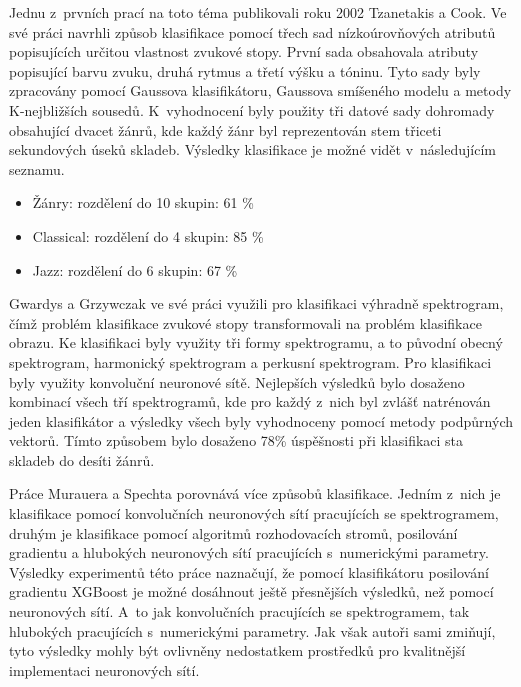 Jednu z~prvních prací na toto téma publikovali roku 2002 Tzanetakis a Cook. Ve své práci navrhli způsob klasifikace pomocí třech sad nízkoúrovňových atributů popisujících určitou vlastnost zvukové stopy. První sada obsahovala atributy popisující barvu zvuku, druhá rytmus a třetí výšku a tóninu. Tyto sady byly zpracovány pomocí Gaussova klasifikátoru, Gaussova smíšeného modelu a metody K-nejbližších sousedů. K~vyhodnocení byly použity tři datové sady dohromady obsahující dvacet žánrů, kde každý žánr byl reprezentován stem třiceti sekundových úseků skladeb. Výsledky klasifikace je možné vidět v~následujícím seznamu.\cite{1021072}

\begin{itemize}
\item Žánry: rozdělení do 10 skupin: 61 \%
\item Classical: rozdělení do 4 skupin: 85 \%
\item Jazz: rozdělení do 6 skupin: 67 \%
\end{itemize}

Gwardys a Grzywczak ve své práci využili pro klasifikaci výhradně spektrogram, čímž problém klasifikace zvukové stopy transformovali na problém klasifikace obrazu. Ke klasifikaci byly využity tři formy spektrogramu, a to původní obecný spektrogram, harmonický spektrogram a perkusní spektrogram. Pro klasifikaci byly využity konvoluční neuronové sítě. Nejlepších výsledků bylo dosaženo kombinací všech tří spektrogramů, kde pro každý z~nich byl zvlášť natrénován jeden klasifikátor a výsledky všech byly vyhodnoceny pomocí metody podpůrných vektorů. Tímto způsobem bylo dosaženo 78\% úspěšnosti při klasifikaci sta skladeb do desíti žánrů.\cite{DeepImageFeaturesinMusicInformationRetrieval}

Práce Murauera a Spechta porovnává více způsobů klasifikace. Jedním z~nich je klasifikace pomocí konvolučních neuronových sítí pracujících se spektrogramem, druhým je klasifikace pomocí algoritmů rozhodovacích stromů, posilování gradientu a hlubokých neuronových sítí pracujících s~numerickými parametry. Výsledky experimentů této práce naznačují, že pomocí klasifikátoru posilování gradientu XGBoost je možné dosáhnout ještě přesnějších výsledků, než pomocí neuronových sítí. A~to jak konvolučních pracujících se spektrogramem, tak hlubokých pracujících s~numerickými parametry. Jak však autoři sami zmiňují, tyto výsledky mohly být ovlivněny nedostatkem prostředků pro kvalitnější implementaci neuronových sítí.\cite{Murauer:2018:DMG:3184558.3191822}

